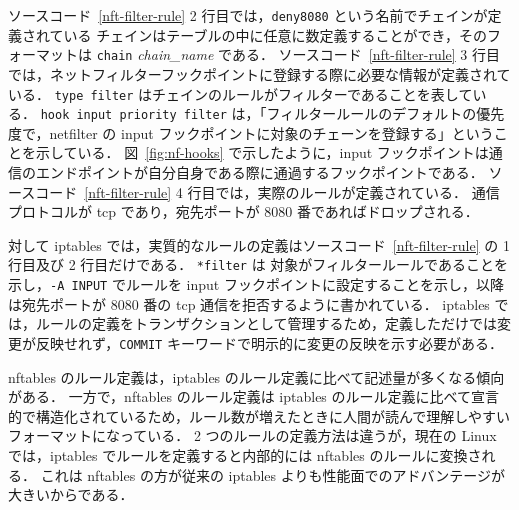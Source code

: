 ソースコード~\ref*{nft-filter-rule} 2 行目では，\texttt{deny8080} という名前でチェインが定義されている
チェインはテーブルの中に任意に数定義することができ，そのフォーマットは \texttt{chain} \textit{chain\_name} である．
ソースコード~\ref*{nft-filter-rule} 3 行目では，ネットフィルターフックポイントに登録する際に必要な情報が定義されている．
\texttt{type filter} はチェインのルールがフィルターであることを表している．
\texttt{hook input priority filter} は，「フィルタールールのデフォルトの優先度で，netfilter の input フックポイントに対象のチェーンを登録する」ということを示している．
図~\ref{fig:nf-hooks} で示したように，input フックポイントは通信のエンドポイントが自分自身である際に通過するフックポイントである．
ソースコード~\ref*{nft-filter-rule} 4 行目では，実際のルールが定義されている．
通信プロトコルが tcp であり，宛先ポートが 8080 番であればドロップされる．

対して iptables では，実質的なルールの定義はソースコード~\ref*{nft-filter-rule} の 1 行目及び 2 行目だけである．
\texttt{*filter} は 対象がフィルタールールであることを示し，\texttt{-A INPUT} でルールを input フックポイントに設定することを示し，以降は宛先ポートが 8080 番の tcp 通信を拒否するように書かれている．
iptables では，ルールの定義をトランザクションとして管理するため，定義しただけでは変更が反映せれず，\texttt{COMMIT} キーワードで明示的に変更の反映を示す必要がある．

nftables のルール定義は，iptables のルール定義に比べて記述量が多くなる傾向がある．
一方で，nftables のルール定義は iptables のルール定義に比べて宣言的で構造化されているため，ルール数が増えたときに人間が読んで理解しやすいフォーマットになっている．
2 つのルールの定義方法は違うが，現在の Linux では，iptables でルールを定義すると内部的には nftables のルールに変換される．
これは nftables の方が従来の iptables よりも性能面でのアドバンテージが大きいからである．

